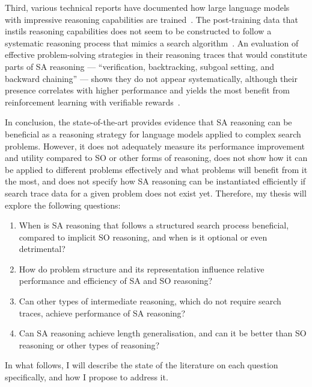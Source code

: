 Third, various technical reports have documented how large language models with impressive reasoning capabilities are trained~\citep{yangQwen3TechnicalReport2025,deepseek-aiDeepSeekR1IncentivizingReasoning2025,lambertTulu3Pushing2025,teamKimiK3Open2026}.
The post-training data that instils reasoning capabilities does not seem to be constructed to follow a systematic reasoning process that mimics a search algorithm~\citep{lambertTulu3Pushing2025,guhaOpenThoughtsDataRecipes2025}.
An evaluation of effective problem-solving strategies in their reasoning traces that would constitute parts of SA reasoning --- ``verification, backtracking, subgoal setting, and backward chaining'' --- shows they do not appear systematically, although their presence correlates with higher performance and yields the most benefit from reinforcement learning with verifiable rewards~\citep{gandhiFourHabitsHighly2025}.

In conclusion, the state-of-the-art provides evidence that SA reasoning can be beneficial as a reasoning strategy for language models applied to complex search problems.
However, it does not adequately measure its performance improvement and utility compared to SO or other forms of reasoning, does not show how it can be applied to different problems effectively and what problems will benefit from it the most, and does not specify how SA reasoning can be instantiated efficiently if search trace data for a given problem does not exist yet.
Therefore, my thesis will explore the following questions:

\begin{enumerate}
    \item When is SA reasoning that follows a structured search process beneficial, compared to implicit SO reasoning, and when is it optional or even detrimental?
    \item How do problem structure and its representation influence relative performance and efficiency of SA and SO reasoning?
    \item Can other types of intermediate reasoning, which do not require search traces, achieve performance of SA reasoning?
    \item Can SA reasoning achieve length generalisation, and can it be better than SO reasoning or other types of reasoning?
\end{enumerate}

In what follows, I will describe the state of the literature on each question specifically, and how I propose to address it.

